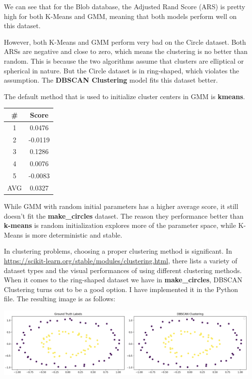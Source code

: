 \begin{solution}
    We can see that for the Blob database, the Adjusted Rand Score (ARS) is pretty high for both K-Means and GMM, meaning that both models perform well on this dataset.

    However, both K-Means and GMM perform very bad on the Circle dataset.
    Both ARSs are negative and close to zero, which means the clustering is no better than random.
    This is because the two algorithms assume that clusters are elliptical or spherical in nature.
    But the Circle dataset is in ring-shaped, which violates the assumption.
    The \textbf{DBSCAN Clustering} model fits this dataset better.

     The default method that is used to initialize cluster centers in GMM is \textbf{kmeans}.

    \begin{center}
        \begin{tabular}{ c c }
            \hline
            \#  & Score   \\
            \hline
            1   & 0.0476  \\
            2   & -0.0119 \\
            3   & 0.1286  \\
            4   & 0.0076  \\
            5   & -0.0083 \\
            \hline
            AVG & 0.0327  \\
            \hline
        \end{tabular}
    \end{center}

    While GMM with random initial parameters has a higher average score, it still doesn't fit the \textbf{make\_circles} dataset.
    The reason they performance better than \textbf{k-means} is random initialization explores more of the parameter space, while K-Means is more deterministic and stable.

     In clustering problems, choosing a proper clustering method is significant.
    In \url{https://scikit-learn.org/stable/modules/clustering.html}, there lists a variety of dataset types and the visual performances of using different clustering methods.
    When it comes to the ring-shaped dataset we have in \textbf{make\_circles}, DBSCAN Clustering turns out to be a good option.
    I have implemented it in the Python file.
    The resulting image is as follows:

    \centerline {
        \includegraphics[width=1.0\textwidth]{img/dbscan}
    }
\end{solution}